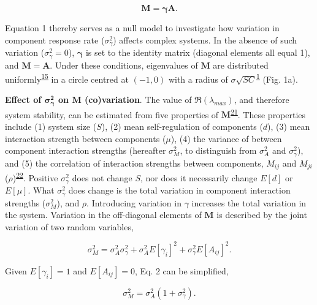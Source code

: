 \documentclass[]{article}
\begin{document}
\begin{equation} \label{defM}
\mathbf{M} = \boldsymbol{\gamma} \mathbf{A}.
\end{equation}

Equation 1 thereby serves as a null model to investigate how
variation in component response rate (\(\sigma^{2}_{\gamma}\)) affects
complex systems. In the absence of such variation
(\(\sigma^{2}_{\gamma} = 0\)), \(\boldsymbol{\gamma}\) is set to the
identity matrix (diagonal elements all equal 1), and
\(\mathbf{M} = \mathbf{A}\). Under these conditions, eigenvalues of
\(\mathbf{M}\) are distributed
uniformly\textsuperscript{\protect\hyperlink{ref-Tao2010}{15}} in a
circle centred at \((-1, 0)\) with a radius of
\(\sigma \sqrt{SC}\)\textsuperscript{\protect\hyperlink{ref-May1972}{1}}
(Fig. 1a).

\textbf{Effect of \(\mathbf{\sigma^{2}_{\gamma}}\) on \(\mathbf{M}\)
(co)variation}. The value of \(\Re(\lambda_{max})\), and therefore
system stability, can be estimated from five properties of
\(\mathbf{M}\)\textsuperscript{\protect\hyperlink{ref-Tang2014b}{21}}.
These properties include (1) system size (\(S\)), (2) mean
self-regulation of components (\(d\)), (3) mean interaction strength
between components (\(\mu\)), (4) the variance of between component
interaction strengths (hereafter \(\sigma^{2}_{M}\), to distinguish from
\(\sigma^{2}_{A}\) and \(\sigma^{2}_{\gamma}\)), and (5) the correlation
of interaction strengths between components, \(M_{ij}\) and \(M_{ji}\)
(\(\rho\))\textsuperscript{\protect\hyperlink{ref-Sommers1988}{22}}.
Positive \(\sigma^{2}_{\gamma}\) does not change \(S\), nor does it
necessarily change \(E[d]\) or \(E[\mu]\). What \(\sigma^{2}_{\gamma}\)
does change is the total variation in component interaction strengths
(\(\sigma^{2}_{M}\)), and \(\rho\). Introducing variation in \(\gamma\)
increases the total variation in the system. Variation in the
off-diagonal elements of \(\mathbf{M}\) is described by the joint
variation of two random variables,

\begin{equation} \label{var_ref}
\sigma^{2}_{M} = \sigma^{2}_{A}\sigma^{2}_{\gamma} + \sigma^{2}_{A}E[\gamma_{i}]^{2}+\sigma^{2}_{\gamma}E[A_{ij}]^{2}.
\end{equation}

Given \(E[\gamma_{i}] = 1\) and \(E[A_{ij}] = 0\), Eq. 2
can be simplified,

\begin{equation}
\sigma^{2}_{M} = \sigma^{2}_{A}(1 + \sigma^{2}_{\gamma}). \nonumber
\end{equation}
\end{document}

